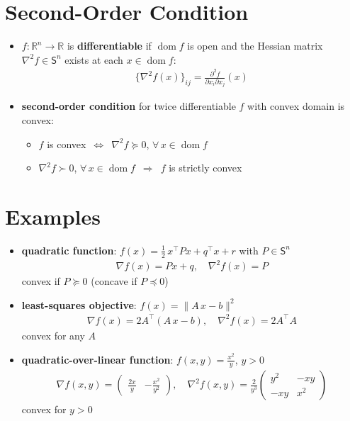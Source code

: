 \documentclass[11pt]{extarticle}
\newcommand{\ds}{\displaystyle}
\newcommand{\ie}{\,\Longrightarrow\,}
\newcommand{\ifff}{\,\Longleftrightarrow\,}
\DeclareMathOperator*{\dom}{dom}
\theoremstyle{definition}
\begin{document}
\newpage

\section*{Second-Order Condition}

\begin{itemize}
  \item $f:\mathbb{R}^n\to\mathbb{R}$ is {\bf differentiable} if $\dom f$ is open and the Hessian matrix $\nabla^2 f\in\mathsf{S}^n$ exists at each $x\in\dom f$: 
    \begin{align*}
      \big\{\nabla^2 f(x)\big\}_{ij} = \frac{\partial^2 f}{\partial x_i\partial x_j}(x)
    \end{align*}
  \item {\bf second-order condition} for twice differentiable $f$ with convex domain is convex: 
    \begin{itemize}
      \item $f$ is convex $\ifff$ $\nabla^2 f\succcurlyeq 0$, $\forall\,x\in\dom f$
      \item $\nabla^2 f\succ 0$, $\forall\,x\in\dom f$ $\ie$ $f$ is strictly convex
    \end{itemize}
\end{itemize}

\newpage

\section*{Examples}

\begin{itemize}
  \item {\bf quadratic function}: $\ds f(x) = \frac{1}{2}\,x^\top P x + q^\top x + r$ with $P\in\mathsf{S}^n$ 
    \begin{align*}
      \nabla f(x) = P x + q,\quad \nabla^2 f(x) = P
    \end{align*}
    convex if $P\succcurlyeq 0$ (concave if $P\preccurlyeq 0$)
  \item {\bf least-squares objective}: $\ds f(x) = \|A\,x - b\|^2$ 
    \begin{align*}
      \nabla f(x) = 2A^\top(A\,x - b),\quad \nabla^2 f(x) = 2 A^\top A 
    \end{align*}
    convex for any $A$
  \item {\bf quadratic-over-linear function}: $\ds f(x, y) = \frac{x^2}{y}$, $y > 0$ 
    \begin{align*}
      \nabla f(x, y) = \begin{pmatrix}\frac{2x}{y} & -\frac{x^2}{y^2}\end{pmatrix},\quad \nabla^2 f(x, y) = \frac{2}{y^3}\begin{pmatrix}y^2 & -xy \\ -xy & x^2 \end{pmatrix}
    \end{align*}
    convex for $y > 0$
\end{itemize}
\end{document}
